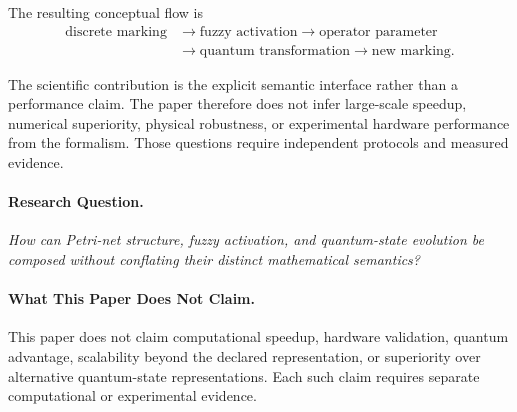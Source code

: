 \documentclass[final,3p,times]{elsarticle}
\begin{document}
The resulting conceptual flow is
\begin{equation}
\begin{aligned}
    \text{discrete marking}
    &\longrightarrow \text{fuzzy activation}
    \longrightarrow \text{operator parameter} \\
    &\longrightarrow \text{quantum transformation}
    \longrightarrow \text{new marking}.
\end{aligned}
\end{equation}

The scientific contribution is the explicit semantic interface rather than a performance claim. The paper therefore does not infer large-scale speedup, numerical superiority, physical robustness, or experimental hardware performance from the formalism. Those questions require independent protocols and measured evidence.

\paragraph{Research Question.} \textit{How can Petri-net structure, fuzzy activation, and quantum-state evolution be composed without conflating their distinct mathematical semantics?}

\paragraph{What This Paper Does Not Claim.} This paper does not claim computational speedup, hardware validation, quantum advantage, scalability beyond the declared representation, or superiority over alternative quantum-state representations. Each such claim requires separate computational or experimental evidence.
\end{document}
